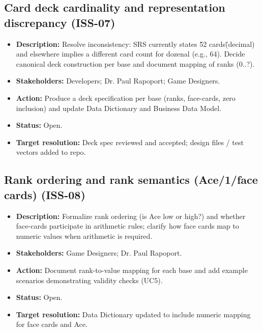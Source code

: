 \documentclass[12pt]{article}
\begin{document}
\subsection{Card deck cardinality and representation discrepancy (ISS-07)}
\begin{itemize}
  \item \textbf{Description:} Resolve inconsistency: SRS currently states \"52 cards\" (decimal) and elsewhere implies a different card count for dozenal (e.g., 64). Decide canonical deck construction per base and document mapping of ranks (0..?).
  \item \textbf{Stakeholders:} Developers; Dr. Paul Rapoport; Game Designers.
  \item \textbf{Action:} Produce a deck specification per base (ranks, face-cards, zero inclusion) and update Data Dictionary and Business Data Model.
  \item \textbf{Status:} Open.
  \item \textbf{Target resolution:} Deck spec reviewed and accepted; design files / test vectors added to repo.
\end{itemize}

\subsection{Rank ordering and rank semantics (Ace/1/face cards) (ISS-08)}
\begin{itemize}
  \item \textbf{Description:} Formalize rank ordering (is Ace low or high?) and whether face-cards participate in arithmetic rules; clarify how face cards map to numeric values when arithmetic is required.
  \item \textbf{Stakeholders:} Game Designers; Dr. Paul Rapoport.
  \item \textbf{Action:} Document rank-to-value mapping for each base and add example scenarios demonstrating validity checks (UC5).
  \item \textbf{Status:} Open.
  \item \textbf{Target resolution:} Data Dictionary updated to include numeric mapping for face cards and Ace.
\end{itemize}
\end{document}
